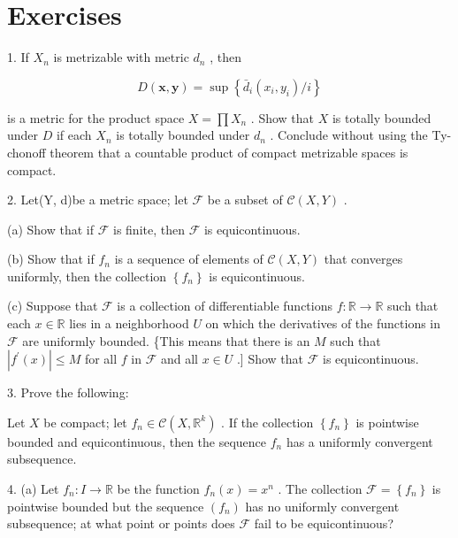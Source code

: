 \section*{Exercises}

1. If \({X}_{n}\) is metrizable with metric \({d}_{n}\) , then

\[
D\left( {\mathbf{x},\mathbf{y}}\right)  = \sup \left\{  {{\bar{d}}_{i}\left( {{x}_{i},{y}_{i}}\right) /i}\right\}
\]

is a metric for the product space \(X = \prod {X}_{n}\) . Show that \(X\) is totally bounded under \(D\) if each \({X}_{n}\) is totally bounded under \({d}_{n}\) . Conclude without using the Ty-chonoff theorem that a countable product of compact metrizable spaces is compact.

2. Let(Y, d)be a metric space; let \(\mathcal{F}\) be a subset of \(\mathcal{C}\left( {X,Y}\right)\) .

(a) Show that if \(\mathcal{F}\) is finite, then \(\mathcal{F}\) is equicontinuous.

(b) Show that if \({f}_{n}\) is a sequence of elements of \(\mathcal{C}\left( {X,Y}\right)\) that converges uniformly, then the collection \(\left\{  {f}_{n}\right\}\) is equicontinuous.

(c) Suppose that \(\mathcal{F}\) is a collection of differentiable functions \(f : \mathbb{R} \rightarrow  \mathbb{R}\) such that each \(x \in  \mathbb{R}\) lies in a neighborhood \(U\) on which the derivatives of the functions in \(\mathcal{F}\) are uniformly bounded. \{This means that there is an \(M\) such that \(\left| {{f}^{\prime }\left( x\right) }\right|  \leq  M\) for all \(f\) in \(\mathcal{F}\) and all \(x \in  U\) .] Show that \(\mathcal{F}\) is equicontinuous.

3. Prove the following:

\begin{theorem} Let \(X\) be compact; let \({f}_{n} \in  \mathcal{C}\left( {X,{\mathbb{R}}^{k}}\right)\) . If the collection \(\left\{  {f}_{n}\right\}\) is pointwise bounded and equicontinuous, then the sequence \({f}_{n}\) has a uniformly convergent subsequence.
\end{theorem}

4. (a) Let \({f}_{n} : I \rightarrow  \mathbb{R}\) be the function \({f}_{n}\left( x\right)  = {x}^{n}\) . The collection \(\mathcal{F} = \left\{  {f}_{n}\right\}\) is pointwise bounded but the sequence \(\left( {f}_{n}\right)\) has no uniformly convergent subsequence; at what point or points does \(\mathcal{F}\) fail to be equicontinuous?

